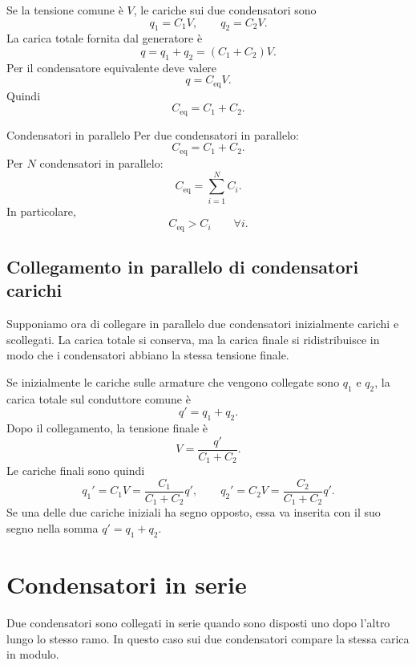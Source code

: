 \documentclass[a4paper]{article}
\begin{document}
Se la tensione comune è \(V\), le cariche sui due condensatori sono
\[
    q_1=C_1V,
    \qquad
    q_2=C_2V.
\]
La carica totale fornita dal generatore è
\[
    q=q_1+q_2=(C_1+C_2)V.
\]
Per il condensatore equivalente deve valere
\[
    q=C_{\mathrm{eq}}V.
\]
Quindi
\[
    C_{\mathrm{eq}}=C_1+C_2.
\]

\begin{snippetproposition}{Condensatori in parallelo}
    Per due condensatori in parallelo:
    \[
        C_{\mathrm{eq}}=C_1+C_2.
    \]
    Per \(N\) condensatori in parallelo:
    \[
        C_{\mathrm{eq}}=\sum_{i=1}^N C_i.
    \]
    In particolare,
    \[
        C_{\mathrm{eq}}>C_i
        \qquad \forall i.
    \]
\end{snippetproposition}

\subsection{Collegamento in parallelo di condensatori carichi}

Supponiamo ora di collegare in parallelo due condensatori inizialmente carichi e scollegati. La carica totale si conserva, ma la carica finale si ridistribuisce in modo che i condensatori abbiano la stessa tensione finale.

Se inizialmente le cariche sulle armature che vengono collegate sono \(q_1\) e \(q_2\), la carica totale sul conduttore comune è
\[
    q'=q_1+q_2.
\]
Dopo il collegamento, la tensione finale è
\[
    V=\frac{q'}{C_1+C_2}.
\]
Le cariche finali sono quindi
\[
    q_1'=C_1V=\frac{C_1}{C_1+C_2}q',
    \qquad
    q_2'=C_2V=\frac{C_2}{C_1+C_2}q'.
\]
Se una delle due cariche iniziali ha segno opposto, essa va inserita con il suo segno nella somma \(q'=q_1+q_2\).

\section{Condensatori in serie}

Due condensatori sono collegati in serie quando sono disposti uno dopo l'altro lungo lo stesso ramo. In questo caso sui due condensatori compare la stessa carica in modulo.

\begin{center}
\end{center}
\end{document}
